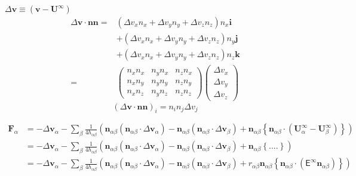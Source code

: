 \documentclass[12pt]{article}
\newcommand{\tens}[1]{\bm{\mathsf{#1}}}
\begin{document}
$\Delta \bm{v} \equiv (\bm{v}- \bm{U}^{\infty})$
\begin{align*}
\Delta \bm{v} \cdot
\bm{n} \bm{n}
= &
(\Delta v_x n_x 
+\Delta v_y n_y
+\Delta v_z n_z) n_x \bm{i}\\
& 
+ (\Delta v_x n_x 
+\Delta v_y n_y
+\Delta v_z n_z) n_y \bm{j}\\
&
+ (\Delta v_x n_x 
+\Delta v_y n_y
+\Delta v_z n_z) n_z \bm{k} \\
=&
\begin{pmatrix}
 n_x n_x &   n_y n_x &   n_z n_x \\
 n_x n_y &   n_y n_y &   n_z n_y \\
 n_x n_z &   n_y n_z &   n_z n_z 
\end{pmatrix}
\begin{pmatrix}
 \Delta v_x \\
 \Delta v_y \\
 \Delta v_z 
\end{pmatrix} 
\end{align*}
\begin{equation*}
(\Delta \bm{v} \cdot
\bm{n} \bm{n})_i
= n_i n_j \Delta v_j
\end{equation*}


\begin{align*}
  \bm{F}_\alpha  &= 
  -  \Delta \bm{v}_\alpha
  - \sum_{\beta}
  \frac{1}{4h_{\alpha\beta}}
  \left(
    \bm{n}_{\alpha\beta} (\bm{n}_{\alpha\beta}\cdot \Delta \bm{v}_{\alpha})
    - 
    \bm{n}_{\alpha\beta} (\bm{n}_{\alpha\beta}\cdot \Delta \bm{v}_\beta )
    +
    \bm{n}_{\alpha\beta}
    \left\{
      \bm{n}_{\alpha\beta}  \cdot
      (\bm{U}_{\alpha}^{\infty}-\bm{U}_{\beta}^{\infty})
    \right\}
  \right)  \\
&=  -  \Delta \bm{v}_\alpha 
 - \sum_{\beta}
  \frac{1}{4h_{\alpha\beta}}
  \left(
    \bm{n}_{\alpha\beta} (\bm{n}_{\alpha\beta}\cdot \Delta \bm{v}_{\alpha})
    - 
    \bm{n}_{\alpha\beta} (\bm{n}_{\alpha\beta}\cdot \Delta \bm{v}_\beta )
    +
    \bm{n}_{\alpha\beta}
    \left\{
  ....
    \right\}
  \right) \\
&=  -  \Delta \bm{v}_\alpha 
 - \sum_{\beta}
  \frac{1}{4h_{\alpha\beta}}
  \left(
    \bm{n}_{\alpha\beta} (\bm{n}_{\alpha\beta}\cdot \Delta \bm{v}_{\alpha})
    - 
    \bm{n}_{\alpha\beta} (\bm{n}_{\alpha\beta}\cdot \Delta \bm{v}_\beta )
    +
r_{\alpha\beta}
  \bm{n}_{\alpha\beta}
  \left\{
\bm{n}_{\alpha\beta} \cdot
(\tens{E}^{\infty} \bm{n}_{\alpha\beta})
    \right\} 
  \right) 
\end{align*}
\end{document}
